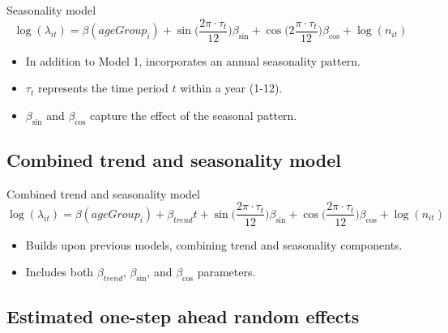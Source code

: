 \documentclass[aspectratio=169]{beamer}
\begin{document}
\begin{frame}{Seasonality model}
\begin{equation}
\log(\lambda_{it})=\beta(ageGroup_{i})+ \sin \bigg(\frac{2\pi\cdot \tau_t}{12}\bigg) \beta_{\sin} + \cos \bigg(2\frac{\pi\cdot \tau_t}{12}\bigg) \beta_{\cos} + \log(n_{it})
\end{equation}

\begin{itemize}
  \item In addition to Model 1, incorporates an annual seasonality pattern.
  \item $\tau_t$ represents the time period $t$ within a year (1-12).
  \item $\beta_{\sin}$ and $\beta_{\cos}$ capture the effect of the seasonal pattern.
\end{itemize}
\end{frame}

\hypertarget{combined-trend-and-seasonality-model}{%
\subsection{Combined trend and seasonality
model}\label{combined-trend-and-seasonality-model}}

\begin{frame}{Combined trend and seasonality model}
\begin{equation}\label{eq:AgegroupTrendSeasonality}
  \log(\lambda_{it})=\beta(ageGroup_{i}) + \beta_{trend} t + \sin \bigg(\frac{2\pi\cdot \tau_t}{12}\bigg) \beta_{\sin} + \cos \bigg(\frac{2\pi\cdot \tau_t}{12}\bigg)\beta_{\cos} + \log(n_{it})
\end{equation}

\begin{itemize}
  \item Builds upon previous models, combining trend and seasonality components.
  \item Includes both $\beta_{trend}$, $\beta_{\sin}$, and $\beta_{\cos}$ parameters.
\end{itemize}
\end{frame}

\hypertarget{estimated-one-step-ahead-random-effects}{%
\subsection{Estimated one-step ahead random
effects}\label{estimated-one-step-ahead-random-effects}}
\end{document}
